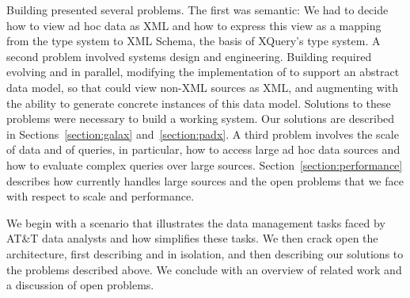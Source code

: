 Building \padx{} presented several problems. The first was semantic:
We had to decide how to view ad hoc data as XML and how to express
this view as a mapping from the \pads{} type system to XML Schema, the
basis of XQuery's type system.  A second problem involved systems
design and engineering.  Building \padx{} required evolving \pads{}
and \Galax{} in parallel, modifying the implementation of \Galax{} to
support an abstract data model, so that \Galax{} could view non-XML
sources as XML, and augmenting \pads{} with the ability to generate
concrete instances of this data model.  Solutions to these problems
were necessary to build a working system.  Our solutions are described
in Sections~\ref{section:galax} and~\ref{section:padx}.  A third
problem involves the scale of data and of queries, in particular, how
to access large ad hoc data sources and how to evaluate complex
queries over large sources.  Section~\ref{section:performance}
describes how \padx{} currently handles large sources and the open
problems that we face with respect to scale and performance.

We begin with a scenario that illustrates the data management
tasks faced by AT\&T data analysts and how \padx{} simplifies these
tasks.  We then crack open the \padx{} architecture, first describing
\pads{} and \Galax{} in isolation, and then describing our solutions
to the problems described above.  We conclude with an overview of
related work and a discussion of open problems.

 

